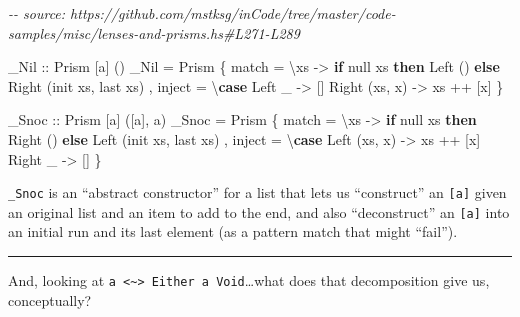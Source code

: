 \documentclass[]{article}
\newenvironment{Shaded}{}{}
\newcommand{\CommentTok}[1]{\textcolor[rgb]{0.38,0.63,0.69}{\textit{#1}}}
\newcommand{\DataTypeTok}[1]{\textcolor[rgb]{0.56,0.13,0.00}{#1}}
\newcommand{\FunctionTok}[1]{\textcolor[rgb]{0.02,0.16,0.49}{#1}}
\newcommand{\KeywordTok}[1]{\textcolor[rgb]{0.00,0.44,0.13}{\textbf{#1}}}
\newcommand{\NormalTok}[1]{#1}
\newcommand{\OperatorTok}[1]{\textcolor[rgb]{0.40,0.40,0.40}{#1}}
\newcommand{\OtherTok}[1]{\textcolor[rgb]{0.00,0.44,0.13}{#1}}
\begin{document}
\begin{Shaded}
\begin{Highlighting}[]
\CommentTok{{-}{-} source: https://github.com/mstksg/inCode/tree/master/code{-}samples/misc/lenses{-}and{-}prisms.hs\#L271{-}L289}

\OtherTok{\_Nil\textquotesingle{} ::} \DataTypeTok{Prism\textquotesingle{}}\NormalTok{ [a] ()}
\NormalTok{\_Nil\textquotesingle{} }\OtherTok{=} \DataTypeTok{Prism\textquotesingle{}}
\NormalTok{    \{ match  }\OtherTok{=}\NormalTok{ \textbackslash{}xs }\OtherTok{{-}>} \KeywordTok{if} \FunctionTok{null}\NormalTok{ xs}
        \KeywordTok{then} \DataTypeTok{Left}\NormalTok{  ()}
        \KeywordTok{else} \DataTypeTok{Right}\NormalTok{ (}\FunctionTok{init}\NormalTok{ xs, }\FunctionTok{last}\NormalTok{ xs)}
\NormalTok{    , inject }\OtherTok{=}\NormalTok{ \textbackslash{}}\KeywordTok{case}
        \DataTypeTok{Left}\NormalTok{ \_        }\OtherTok{{-}>}\NormalTok{ []}
        \DataTypeTok{Right}\NormalTok{ (xs, x) }\OtherTok{{-}>}\NormalTok{ xs }\OperatorTok{++}\NormalTok{ [x]}
\NormalTok{    \}}

\OtherTok{\_Snoc ::} \DataTypeTok{Prism\textquotesingle{}}\NormalTok{ [a] ([a], a)}
\NormalTok{\_Snoc }\OtherTok{=} \DataTypeTok{Prism\textquotesingle{}}
\NormalTok{    \{ match  }\OtherTok{=}\NormalTok{ \textbackslash{}xs }\OtherTok{{-}>} \KeywordTok{if} \FunctionTok{null}\NormalTok{ xs}
        \KeywordTok{then} \DataTypeTok{Right}\NormalTok{ ()}
        \KeywordTok{else} \DataTypeTok{Left}\NormalTok{  (}\FunctionTok{init}\NormalTok{ xs, }\FunctionTok{last}\NormalTok{ xs)}
\NormalTok{    , inject }\OtherTok{=}\NormalTok{ \textbackslash{}}\KeywordTok{case}
        \DataTypeTok{Left}\NormalTok{  (xs, x) }\OtherTok{{-}>}\NormalTok{ xs }\OperatorTok{++}\NormalTok{ [x]}
        \DataTypeTok{Right}\NormalTok{ \_       }\OtherTok{{-}>}\NormalTok{ []}
\NormalTok{    \}}
\end{Highlighting}
\end{Shaded}

\texttt{\_Snoc} is an ``abstract constructor'' for a list that lets us
``construct'' an \texttt{{[}a{]}} given an original list and an item to add to
the end, and also ``deconstruct'' an \texttt{{[}a{]}} into an initial run and
its last element (as a pattern match that might ``fail'').

\begin{center}\rule{0.5\linewidth}{\linethickness}\end{center}

And, looking at
\texttt{a\ \textless{}\textasciitilde{}\textgreater{}\ Either\ a\ Void}\ldots what
does that decomposition give us, conceptually?
\end{document}
